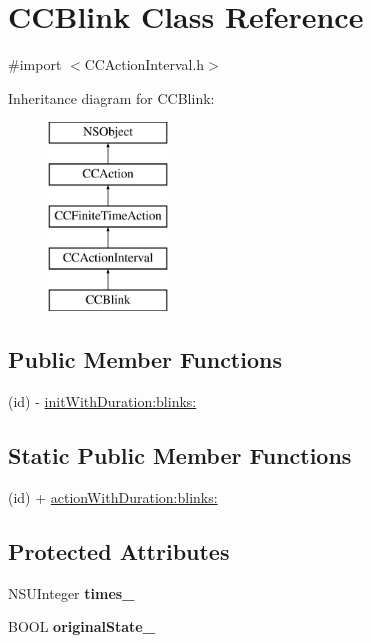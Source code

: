 \hypertarget{interface_c_c_blink}{\section{C\-C\-Blink Class Reference}
\label{interface_c_c_blink}
}


{\ttfamily \#import $<$C\-C\-Action\-Interval.\-h$>$}

Inheritance diagram for C\-C\-Blink\-:\begin{figure}[H]
\begin{center}
\leavevmode
\includegraphics[height=5.000000cm]{interface_c_c_blink}
\end{center}
\end{figure}
\subsection*{Public Member Functions}
\begin{DoxyCompactItemize}
\item 
(id) -\/ \hyperlink{interface_c_c_blink_aecfa85f71a1969802fc5a5f2d743863a}{init\-With\-Duration\-:blinks\-:}
\end{DoxyCompactItemize}
\subsection*{Static Public Member Functions}
\begin{DoxyCompactItemize}
\item 
(id) + \hyperlink{interface_c_c_blink_a6e9781f940828bc29b6b45f01cbd3505}{action\-With\-Duration\-:blinks\-:}
\end{DoxyCompactItemize}
\subsection*{Protected Attributes}
\begin{DoxyCompactItemize}
\item 
\hypertarget{interface_c_c_blink_a3e1c0702fb99816e7aaf3978438234be}{N\-S\-U\-Integer {\bfseries times\-\_\-}}\label{interface_c_c_blink_a3e1c0702fb99816e7aaf3978438234be}

\item 
\hypertarget{interface_c_c_blink_a20a34fb7fa10f5f20eb172ad1c96d2eb}{B\-O\-O\-L {\bfseries original\-State\-\_\-}}\label{interface_c_c_blink_a20a34fb7fa10f5f20eb172ad1c96d2eb}

\end{DoxyCompactItemize}


